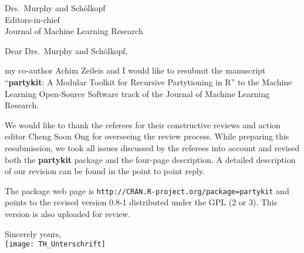 \documentclass[ngerman,uzh]{scrlttr2}
\begin{document}

\begin{letter}{
Drs.~Murphy and Schölkopf \\
Editors-in-chief \\
Journal of Machine Learning Research}

\subject{JMLR-14-133 resubmission}

\opening{Dear Drs.~Murphy and Schölkopf,}

my co-author Achim Zeileis and I would like to resubmit the manuscript
``\textbf{partykit}: A Modular Toolkit for Recursive Partytioning in R'' to the
Machine Learning Open-Source Software track of the Journal of Machine
Learning Research.

We would like to thank the referees for their constructive reviews and
action editor Cheng Soon Ong for overseeing the review process. While
preparing this resubmission, we took all issues discussed by the referees
into account and revised both the \textbf{partykit} package and the four-page
description. A detailed description of our revision can be found in the
point to point reply.

The package web page is \texttt{http://CRAN.R-project.org/package=partykit}
and points to the revised version 0.8-1 distributed under the GPL (2 or 3).
This version is also uploaded for review. 

Sincerely yours, \\
\texttt{[image: TH\_Unterschrift]}

\end{letter}
\end{document}
